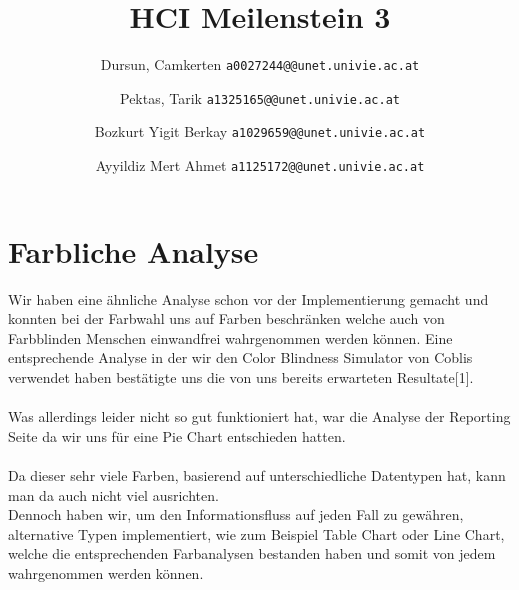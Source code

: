 \documentclass[runningheads,a4paper]{llncs}
\begin{document}
\mainmatter  %

\title{HCI Meilenstein 3}


\author{
  Dursun, Camkerten
  \texttt{a0027244@@unet.univie.ac.at}
  \and
  Pektas, Tarik
  \texttt{a1325165@@unet.univie.ac.at}
  \and
  Bozkurt Yigit Berkay
  \texttt{a1029659@@unet.univie.ac.at}
  \and
  Ayyildiz Mert Ahmet
  \texttt{a1125172@@unet.univie.ac.at}
}



\maketitle

\section{Farbliche Analyse}
Wir haben eine ähnliche Analyse schon vor der Implementierung gemacht und konnten bei der Farbwahl uns auf Farben beschränken welche auch von Farbblinden Menschen einwandfrei wahrgenommen werden können. Eine entsprechende Analyse in der wir den Color Blindness Simulator von Coblis verwendet haben bestätigte uns die von uns bereits erwarteten Resultate[1].\\ \\ 
Was allerdings leider nicht so gut funktioniert hat, war die Analyse der Reporting Seite da wir uns für eine Pie Chart entschieden hatten.\\\\ Da dieser sehr viele Farben, basierend auf unterschiedliche Datentypen hat, kann man da auch nicht viel ausrichten.\\ Dennoch haben wir, um den Informationsfluss auf jeden Fall zu gewähren, alternative Typen implementiert, wie zum Beispiel Table Chart oder Line Chart, welche die entsprechenden Farbanalysen bestanden haben und somit von jedem wahrgenommen werden können.
\end{document}
